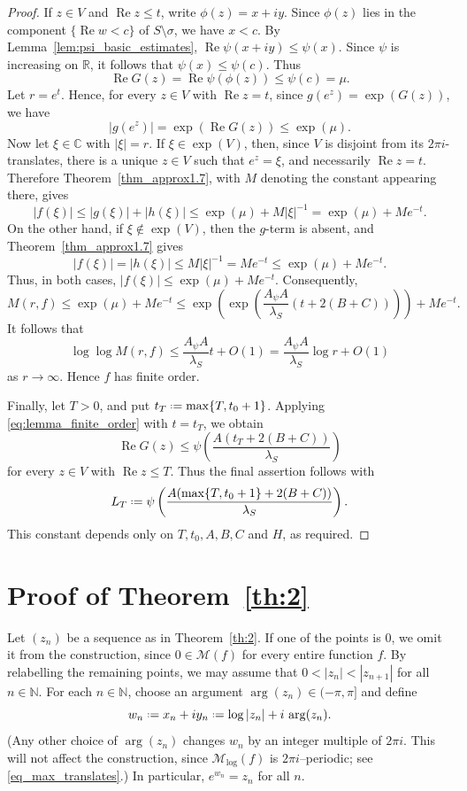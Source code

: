 \documentclass[a4paper, 11pt, reqno]{amsart}
\numberwithin{equation}{section}
\theoremstyle{plain}
\newcommand*{\defeq}{\mathrel{\vcenter{\baselineskip0.5ex \lineskiplimit0pt
 \hbox{\scriptsize.}\hbox{\scriptsize.}}}=}
\theoremstyle{remark}
\newcommand{\C}{{\mathbb{C}}}
\newcommand{\R}{{\mathbb{R}}}
\newcommand{\N}{{\mathbb{N}}}
\newcommand{\M}{{\mathcal{M}}}
\newcommand{\Mlog}{{\mathcal{M}_{\log}}}
\newcommand{\Rea}{\operatorname{Re }}
\begin{document}
\begin{proof}
If \(z\in V\) and \(\Rea z\le t\), write \(\phi(z)=x+iy\). Since \(\phi(z)\) lies in the component \(\{\Rea w<c\}\) of \(S\setminus\sigma\), we have \(x<c\). By Lemma~\ref{lem:psi_basic_estimates},
$
\Rea\psi(x+iy)\le \psi(x).
$
Since \(\psi\) is increasing on \(\R\), it follows that \(\psi(x)\le\psi(c)\).
Thus
\begin{equation}\label{eq:lemma_finite_order}
	\Rea G(z)=\Rea\psi(\phi(z))\le\psi(c)=\mu.
\end{equation}
Let \(r=e^t\). Hence, for every \(z\in V\) with \(\Rea z=t\), since \(g(e^z)=\exp(G(z))\), we have
\[
|g(e^z)|=\exp(\Rea G(z))\le \exp(\mu).
\]
Now let \(\xi\in\C\) with \(|\xi|=r\). If \(\xi\in\exp(V)\), then, since \(V\) is disjoint from its \(2\pi i\)-translates, there is a unique \(z\in V\) such that \(e^z=\xi\), and necessarily \(\Rea z=t\). Therefore Theorem~\ref{thm_approx1.7}, with \(M\) denoting the constant appearing there, gives
\[
|f(\xi)|
\le |g(\xi)|+|h(\xi)|
\le \exp(\mu)+M|\xi|^{-1}
= \exp(\mu)+Me^{-t}.
\]
On the other hand, if \(\xi\notin\exp(V)\), then the \(g\)-term is absent, and Theorem~\ref{thm_approx1.7} gives
\[
|f(\xi)|=|h(\xi)|\le M|\xi|^{-1}=Me^{-t}
\le \exp(\mu)+Me^{-t}.
\]
Thus, in both cases,
$
|f(\xi)|\le \exp(\mu)+Me^{-t}.
$
Consequently,
\[
M(r,f)
\le
\exp(\mu)+Me^{-t}
\le
\exp\left(\exp\left(\frac{A_\psi A}{\lambda_S}(t+2(B+C))\right)\right)
+Me^{-t}.
\]
It follows that
\[
\log\log M(r,f)
\le
\frac{A_\psi A}{\lambda_S}t+O(1)
=
\frac{A_\psi A}{\lambda_S}\log r+O(1)
\]
as \(r\to\infty\). Hence \(f\) has finite order.

Finally, let \(T>0\), and put \(t_T\defeq\max\{T,t_0+1\}\). Applying
\eqref{eq:lemma_finite_order} with \(t=t_T\), we obtain
\[
\Rea G(z)\le \psi\left(\frac{A(t_T+2(B+C))}{\lambda_S}\right)
\]
for every \(z\in V\) with \(\Rea z\le T\). Thus the final assertion follows
with
\[
L_T\defeq
\psi\left(\frac{A(\max\{T,t_0+1\}+2(B+C))}{\lambda_S}\right).
\]
This constant depends only on \(T,t_0,A,B,C\) and \(H\), as required.
\end{proof}
\section{Proof of Theorem~\ref{th:2}}\label{S.th2}

Let \((z_n)\) be a sequence as in Theorem~\ref{th:2}. If one of the points is \(0\), we omit it from the construction, since \(0\in\M(f)\) for every entire function \(f\). By relabelling the remaining points, we may assume that \(0<|z_n|<|z_{n+1}|\) for all \(n\in\N\). For each \(n\in\N\), choose an argument \(\arg(z_n)\in(-\pi,\pi]\) and define
\[
w_n \defeq x_n+iy_n \defeq \log|z_n| + i\,\arg(z_n).
\]
(Any other choice of $\arg(z_n)$ changes $w_n$ by an integer multiple of $2\pi i$. This will not affect the construction, since $\Mlog(f)$ is $2\pi i$--periodic; see \eqref{eq_max_translates}.)
In particular, $e^{w_n}=z_n$ for all $n$.
\end{document}
